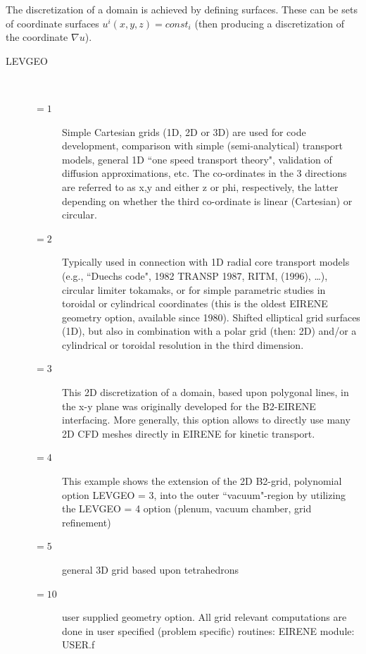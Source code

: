 The discretization of a domain is achieved by defining surfaces.
These can be sets of coordinate surfaces $u^i(x,y,z) = const_i$ (then producing
a discretization of the coordinate $\nabla u$).

\begin{description}
  \item[LEVGEO] ~ 

        \begin{description}
          \item[$= 1$] Simple Cartesian grids (1D, 2D or 3D) are used
                for code development, comparison with simple (semi-analytical) transport
                models, general 1D  ``one speed transport theory", validation of diffusion
                approximations, etc. The co-ordinates in the 3 directions are referred to as
                x,y and either z or phi, respectively, the latter depending on whether the
                third co-ordinate is linear (Cartesian) or circular.
          \item[$= 2$] Typically used in connection with 1D radial core transport models
                (e.g., ``Duechs code", 1982 TRANSP 1987, RITM, (1996), \dots), circular limiter
                tokamaks, or for simple parametric studies in toroidal or cylindrical
                coordinates (this is the oldest EIRENE geometry option, available since 1980).
                Shifted elliptical grid surfaces (1D), but also in combination with a polar
                grid (then: 2D) and/or a cylindrical or toroidal resolution in the third
                dimension.
          \item[$= 3$] This 2D discretization of a domain, based upon polygonal lines,
                in the x-y plane was originally developed for the B2-EIRENE interfacing.
                More generally, this option allows to directly use many 2D \ac{CFD} meshes
                directly in EIRENE for kinetic transport.
          \item[$= 4$] This example shows the extension of the 2D B2-grid, polynomial
                option LEVGEO = 3, into the outer ``vacuum"-region by utilizing the LEVGEO = 4
                option (plenum, vacuum chamber, grid refinement)
          \item[$= 5$] general 3D grid
                based upon tetrahedrons
          \item[$= 10$] user supplied geometry option.
                All grid relevant computations are
                done in user specified (problem specific) routines: EIRENE
                module:  USER.f
        \end{description}
\end{description}
